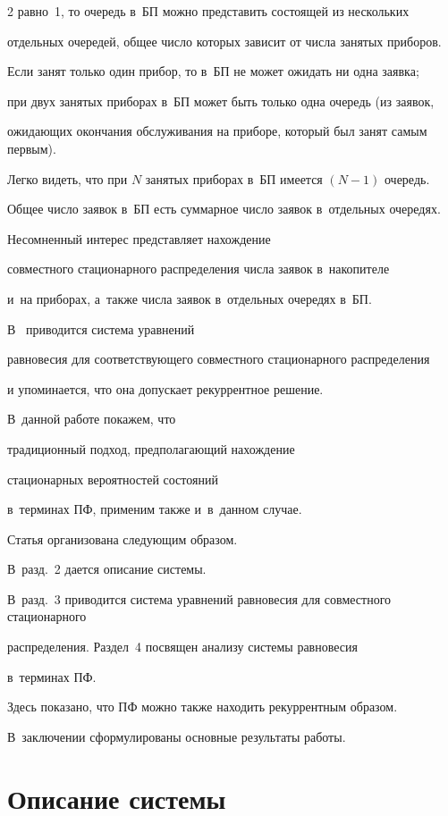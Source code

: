 \begin{multicols}{2}
 равно~1, то очередь в~БП можно представить состоящей из нескольких


отдельных очередей, общее число которых зависит от числа занятых приборов.


Если занят только один прибор, то в~БП не может ожидать ни одна заявка;


при двух занятых приборах в~БП может быть только одна очередь (из заявок,


ожидающих окончания обслуживания на приборе, который был занят самым первым).


Легко видеть, что при $N$ занятых приборах в~БП имеется $(N-1)$ очередь.


Общее число заявок в~БП есть суммарное число заявок в~отдельных очередях.


Несомненный интерес представляет нахождение


совместного стационарного распределения числа заявок в~накопителе 


и~на приборах, а~также числа заявок в~отдельных очередях в~БП.


В~\cite{pr2015} приводится система уравнений


равновесия для соответствующего совместного стационарного распределения


и упоминается, что она допускает рекуррентное решение.


В~данной работе покажем, что


традиционный подход, предполагающий нахождение


стационарных вероятностей состояний


в~терминах ПФ, применим также и~в~данном \mbox{случае}.





Статья организована следующим образом.


В~разд.~2 дается описание системы.


В~разд.~3 приводится система уравнений равновесия для совместного стационарного


распределения. Раздел~4 посвящен анализу системы равновесия


в~терминах ПФ.


Здесь показано, что ПФ можно также находить рекуррентным образом.


В~заключении сформулированы основные результаты работы.





\section{Описание системы}






\end{multicols}
